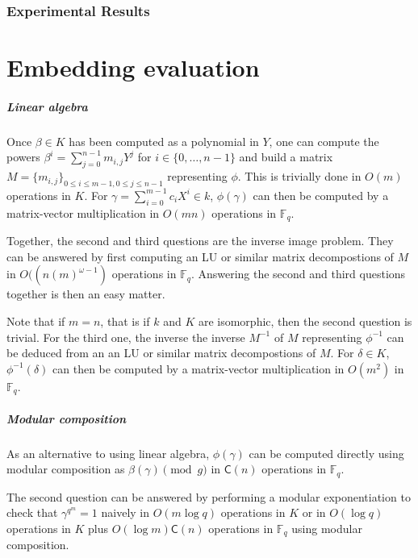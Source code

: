 \documentclass[12pt]{article}
\theoremstyle{plain}
\theoremstyle{definition}
\def\F{\ensuremath{\mathbb{F}}}
\def\CC{\ensuremath{\mathsf{C}}}
\begin{document}
\section{Experimental Results}


\part{Embedding evaluation}
\label{part:eval}


\subsubsection{Linear algebra}

Once $\beta \in K$ has been computed as a polynomial in $Y$,
one can compute the powers
$\beta^i = \sum_{j=0}^{n-1} m_{i,j} Y^j$
for $i \in \{0, \ldots, n-1\}$ and build a matrix
$M = \{m_{i, j}\}_{0\leq i \leq m-1, 0 \leq j \leq n -1}$
representing $\phi$.
This is trivially done in $O(m)$ operations in $K$.
For $\gamma = \sum_{i = 0}^{m - 1} c_i X^i \in k$,
$\phi(\gamma)$ can then be computed by a
matrix-vector multiplication in $O(m n)$ operations in $\F_q$.

Together, the second and third questions are the inverse image problem.
They can be answered by first computing 
an LU or similar matrix decompostions of $M$
in $O((n (m)^{\omega - 1})$ operations in $\F_q$.
Answering the second and third questions together is then
an easy matter.

Note that if $m = n$, that is if $k$ and $K$ are
isomorphic, then the second question is trivial.
For the third one, the inverse
the inverse $M^{-1}$ of $M$ representing $\phi^{-1}$
can be deduced from an an LU or similar matrix decompostions of $M$.
For $\delta \in K$, $\phi^{-1}(\delta)$ can then be computed by a
matrix-vector multiplication in $O(m^2)$ in $\F_q$.

\subsubsection{Modular composition}

As an alternative to using linear algebra,
$\phi(\gamma)$ can be computed directly using modular composition
as $\beta(\gamma) \pmod{g}$ in $\CC(n)$ operations in $\F_q$.

The second question can be answered by performing a modular
exponentiation to check that $\gamma^{q^{m}} = 1$
naively in $O(m \log q)$ operations in $K$
or in $O(\log q)$ operations in $K$ plus
$O(\log m) \CC(n)$ operations in $\F_q$ using modular composition.
\end{document}
